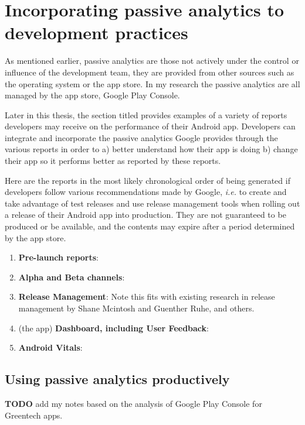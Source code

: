 \section{Incorporating passive analytics to development practices}
As mentioned earlier, passive analytics are those not actively under the control or influence of the development team, they are provided from other sources such as the operating system or the app store. In my research the passive analytics are all managed by the app store, Google Play Console.

Later in this thesis, the section titled \href{google_play_console_section}{\emph{}} provides examples of a variety of reports developers may receive on the performance of their Android app. Developers can integrate and incorporate the passive analytics Google provides through the various reports in order to a) better understand how their app is doing b) change their app so it performs better as reported by these reports.

Here are the reports in the most likely chronological order of being generated if developers follow various recommendations made by Google, \emph{i.e.} to create and take advantage of test releases and use release management tools when rolling out a release of their Android app into production. They are not guaranteed to be produced or be available, and the contents may expire after a period determined by the app store.

\begin{enumerate}
    \item \textbf{Pre-launch reports}: 
    \item \textbf{Alpha and Beta channels}:
    \item \textbf{Release Management}: Note this fits with existing research in release management by Shane Mcintosh and Guenther Ruhe, and others.
    
    \item (the app) \textbf{Dashboard, including User Feedback}:
    \item \textbf{Android Vitals}:
\end{enumerate}

\subsection{Using passive analytics productively}

\textbf{TODO} add my notes based on the analysis of Google Play Console for Greentech apps.


